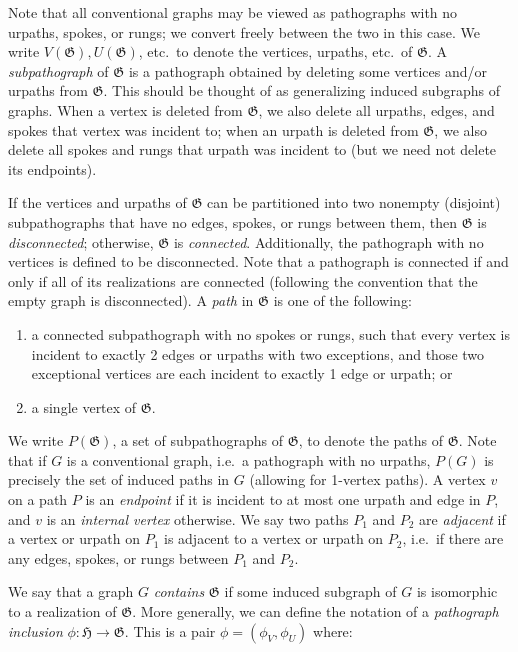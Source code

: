\documentclass{article}
\newcommand{\Gf}{\mathfrak{G}}
\newcommand{\Hf}{\mathfrak{H}}
\begin{document}
Note that all conventional graphs may be viewed as pathographs with no urpaths, spokes, or rungs; we convert freely between the two in this case. We write $V(\Gf),U(\Gf)$, etc.\ to denote the vertices, urpaths, etc.\ of $\Gf$. A \textit{subpathograph} of $\Gf$ is a pathograph obtained by deleting some vertices and/or urpaths from $\Gf$. This should be thought of as generalizing induced subgraphs of graphs. When a vertex is deleted from $\Gf$, we also delete all urpaths, edges, and spokes that vertex was incident to; when an urpath is deleted from $\Gf$, we also delete all spokes and rungs that urpath was incident to (but we need not delete its endpoints).

If the vertices and urpaths of $\Gf$ can be partitioned into two nonempty (disjoint) subpathographs that have no edges, spokes, or rungs between them, then $\Gf$ is \textit{disconnected}; otherwise, $\Gf$ is \textit{connected}. Additionally, the pathograph with no vertices is defined to be disconnected. Note that a pathograph is connected if and only if all of its realizations are connected (following the convention that the empty graph is disconnected). A \textit{path} in $\Gf$ is one of the following:
\begin{enumerate}
    \item a connected subpathograph with no spokes or rungs, such that every vertex is incident to exactly 2 edges or urpaths with two exceptions, and those two exceptional vertices are each incident to exactly 1 edge or urpath; or
    \item a single vertex of $\Gf$.
\end{enumerate}
We write $P(\Gf)$, a set of subpathographs of $\Gf$, to denote the paths of $\Gf$. Note that if $G$ is a conventional graph, i.e.\ a pathograph with no urpaths, $P(G)$ is precisely the set of induced paths in $G$ (allowing for 1-vertex paths). A vertex $v$ on a path $P$ is an \textit{endpoint} if it is incident to at most one urpath and edge in $P$, and $v$ is an \textit{internal vertex} otherwise. We say two paths $P_1$ and $P_2$ are \textit{adjacent} if a vertex or urpath on $P_1$ is adjacent to a vertex or urpath on $P_2$, i.e.\ if there are any edges, spokes, or rungs between $P_1$ and $P_2$.

We say that a graph $G$ \textit{contains} $\Gf$ if some induced subgraph of $G$ is isomorphic to a realization of $\Gf$. More generally, we can define the notation of a \textit{pathograph inclusion} $\phi:\Hf\to \Gf$. This is a pair $\phi = (\phi_V, \phi_U)$ where:
\end{document}
